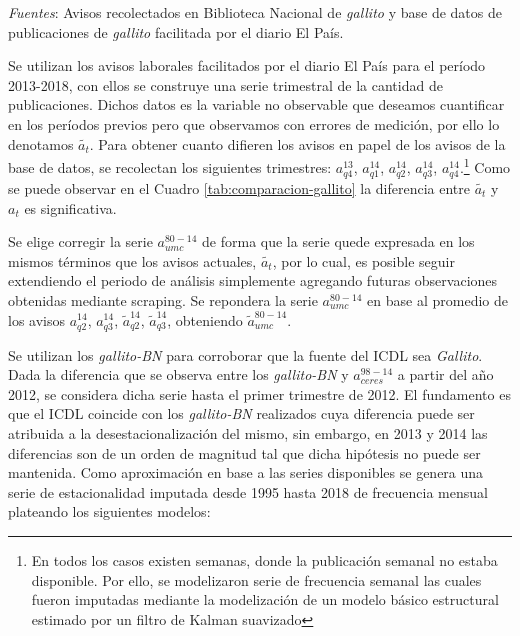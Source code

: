 \documentclass[12pt,oneside]{reedthesis}
\begin{document}
\begin{table}[!h]
\begin{threeparttable}
\begin{tablenotes}
\textit{Fuentes}: Avisos recolectados en Biblioteca Nacional de \textit{gallito} y base de datos de publicaciones de \textit{gallito} facilitada por el diario El País.
\end{tablenotes}
\end{threeparttable}
\end{table}
Se utilizan los avisos laborales facilitados por el diario El País para el período 2013-2018, con ellos se construye una serie trimestral de la cantidad de publicaciones.
Dichos datos es la variable no observable que deseamos cuantificar en los períodos previos pero que observamos con errores de medición, por ello lo denotamos \(\tilde{a_t}\). Para obtener cuanto difieren los avisos en papel de los avisos de la base de datos, se recolectan los siguientes trimestres: \(a_{q4}^{13}\), \(a_{q1}^{14}\), \(a_{q2}^{14}\), \(a_{q3}^{14}\), \(a_{q4}^{14}\).\footnote{En todos los casos existen semanas, donde la publicación semanal no estaba disponible. Por ello, se modelizaron serie de frecuencia semanal las cuales fueron imputadas mediante la modelización de un modelo básico estructural estimado por un filtro de Kalman suavizado} Como se puede observar en el Cuadro \ref{tab:comparacion-gallito} la diferencia entre \(\tilde{a_t}\) y \({a_t}\) es significativa.

Se elige corregir la serie \(a_{umc}^{80-14}\) de forma que la serie quede expresada en los mismos términos que los avisos actuales, \(\tilde{a_t}\), por lo cual, es posible seguir extendiendo el periodo de análisis simplemente agregando futuras observaciones obtenidas mediante scraping. Se repondera la serie \(a_{umc}^{80-14}\) en base al promedio de los avisos \(a_{q2}^{14}\), \(a_{q3}^{14}\), \(\tilde{a}_{q2}^{14}\), \(\tilde{a}_{q3}^{14}\), obteniendo \(\tilde{a}_{umc}^{80-14}\).

Se utilizan los \emph{gallito-BN} para corroborar que la fuente del ICDL sea \emph{Gallito}.
Dada la diferencia que se observa entre los \emph{gallito-BN} y \(a_{ceres}^{98-14}\) a partir del año 2012, se considera dicha serie hasta el primer trimestre de 2012. El fundamento es que el ICDL coincide con los \emph{gallito-BN} realizados cuya diferencia puede ser atribuida a la desestacionalización del mismo, sin embargo, en 2013 y 2014 las diferencias son de un orden de magnitud tal que dicha hipótesis no puede ser mantenida.
Como aproximación en base a las series disponibles se genera una serie de estacionalidad imputada desde 1995 hasta 2018 de frecuencia mensual plateando los siguientes modelos:
\end{document}
